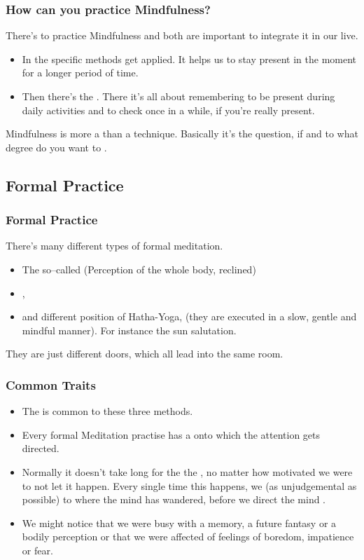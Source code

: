 \begin{frame}
\frametitle{How can you practice Mindfulness?}
There's  to practice Mindfulness and both are important to integrate it in our live.
\begin{itemize}
\item In the  specific methods get applied. It helps us to stay present in the moment for a longer period of time.
\item Then there's the . There it's all about remembering to be present during daily activities and to check once in a while, if you're really present. 
\end{itemize}
Mindfulness is more a  than a technique. Basically it's the question, if and to what degree do you want to .  
\end{frame}

\subsection{Formal Practice}
\begin{frame}
\frametitle{Formal Practice}
There's many different types of formal meditation. 
\begin{itemize}
\item The so--called  (Perception of the whole body, reclined)
\item {}, 
\item and different position of Hatha-Yoga, (they are executed in a slow, gentle and mindful manner). For instance the sun salutation. 
\end{itemize}
They are just different doors, which all lead into the same room.

\end{frame}


\begin{frame}
\frametitle{Common Traits}
\begin{itemize}
\item The  is common to these three methods.
\item Every formal Meditation practise has a  onto which the attention gets directed.
\item Normally it doesn't take long for the the , no matter how motivated we were to not let it happen. Every single time this happens, we  (as unjudgemental as possible) to where the mind has wandered, before we direct the mind .
\item We might notice that we were busy with a memory, a future fantasy or a bodily perception or that we were affected of feelings of boredom, impatience or fear.
\end{itemize}
\end{frame}

